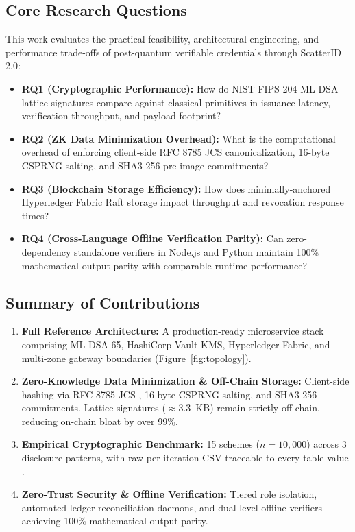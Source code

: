 \documentclass[5p,times,authoryear]{elsarticle}
\begin{document}
\subsection{Core Research Questions}
\label{sec:rqs}
This work evaluates the practical feasibility, architectural engineering, and performance trade-offs of post-quantum verifiable credentials through ScatterID 2.0:
\begin{itemize}[leftmargin=*]
\item \textbf{RQ1 (Cryptographic Performance):} How do NIST FIPS 204 ML-DSA lattice signatures compare against classical primitives in issuance latency, verification throughput, and payload footprint?
\item \textbf{RQ2 (ZK Data Minimization Overhead):} What is the computational overhead of enforcing client-side RFC 8785 JCS \cite{rfc8785} canonicalization, 16-byte CSPRNG salting, and SHA3-256 pre-image commitments?
\item \textbf{RQ3 (Blockchain Storage Efficiency):} How does minimally-anchored Hyperledger Fabric Raft storage impact throughput and revocation response times?
\item \textbf{RQ4 (Cross-Language Offline Verification Parity):} Can zero-dependency standalone verifiers in Node.js and Python maintain 100\% mathematical output parity with comparable runtime performance?
\end{itemize}

\subsection{Summary of Contributions}
\begin{enumerate}[leftmargin=*]
\item \textbf{Full Reference Architecture:} A production-ready microservice stack comprising ML-DSA-65, HashiCorp Vault KMS, Hyperledger Fabric, and multi-zone gateway boundaries (Figure~\ref{fig:topology}).
\item \textbf{Zero-Knowledge Data Minimization \& Off-Chain Storage:} Client-side hashing via RFC 8785 JCS \cite{rfc8785}, 16-byte CSPRNG salting, and SHA3-256 commitments. Lattice signatures ($\approx 3.3$~KB) remain strictly off-chain, reducing on-chain bloat by over 99\%.
\item \textbf{Empirical Cryptographic Benchmark:} 15 schemes ($n = 10{,}000$) across 3 disclosure patterns, with raw per-iteration CSV traceable to every table value \cite{shams2026benchmarks}.
\item \textbf{Zero-Trust Security \& Offline Verification:} Tiered role isolation, automated ledger reconciliation daemons, and dual-level offline verifiers achieving 100\% mathematical output parity.
\end{enumerate}
\end{document}
